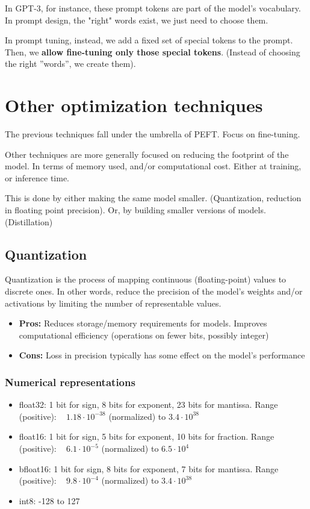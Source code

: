In GPT-3, for instance, these prompt tokens are
part of the model's vocabulary. In prompt design, the "right" words exist, we just need
to choose them.

In prompt tuning, instead, we add a fixed set of
special tokens to the prompt.
Then, we \textbf{allow fine-tuning only those special tokens}. (Instead of choosing the right ”words”, we create them).


\section{Other optimization techniques}

The previous techniques fall under the umbrella of PEFT. Focus on fine-tuning.

Other techniques are more generally focused on reducing the
footprint of the model. In terms of memory used, and/or computational cost. Either at training, or inference time.

This is done by either making the same model smaller. (Quantization, reduction in floating point precision). Or, by building smaller versions of models. (Distillation)



\subsection{Quantization}

Quantization is the process of mapping continuous (floating-point)
values to discrete ones.
In other words, reduce the precision of the model's weights and/or
activations by limiting the number of representable values.

\begin{itemize}
  \item \textbf{Pros:} Reduces storage/memory requirements for models. Improves computational efficiency (operations on fewer bits, possibly integer)
  \item \textbf{Cons:} Loss in precision typically has some effect on the model's performance
\end{itemize}

\subsubsection{Numerical representations }

\begin{itemize}
  \item float32: 1 bit for sign, 8 bits for exponent, 23 bits for mantissa. Range (positive): ~ $1.18 \cdot 10^{-38}$ (normalized) to $3.4 \cdot 10^{38}$
  \item float16: 1 bit for sign, 5 bits for exponent, 10 bits for fraction. Range (positive): ~ $6.1 \cdot 10^{-5}$ (normalized) to $6.5 \cdot 10^{4}$
  \item bfloat16: 1 bit for sign, 8 bits for exponent, 7 bits for mantissa. Range (positive): ~ $9.8 \cdot 10^{-4}$ (normalized) to $3.4 \cdot 10^{38}$
  \item int8: -128 to 127
\end{itemize}

